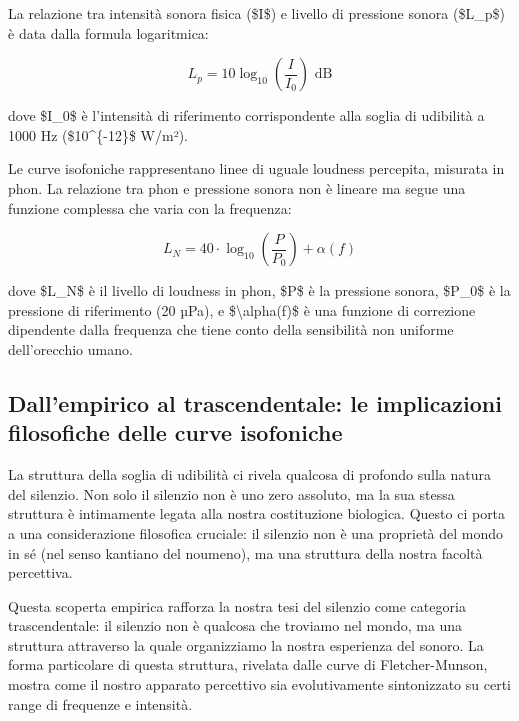 \documentclass[a4paper,11pt]{article}
\begin{document}
La relazione tra intensità sonora fisica (\$I\$) e livello di pressione
sonora (\$L\_p\$) è data dalla formula logaritmica:

\begin{displaymath}
L_p = 10 \log_{10}\left(\frac{I}{I_0}\right) \text{ dB}
\end{displaymath}

dove \$I\_0\$ è l'intensità di riferimento corrispondente alla soglia di
udibilità a 1000 Hz (\$10\^{}\{-12\}\$ W/m²).

Le curve isofoniche rappresentano linee di uguale loudness percepita,
misurata in phon. La relazione tra phon e pressione sonora non è lineare
ma segue una funzione complessa che varia con la frequenza:

\begin{displaymath}
L_N = 40 \cdot \log_{10}\left(\frac{P}{P_0}\right) + \alpha(f)
\end{displaymath}

dove \$L\_N\$ è il livello di loudness in phon, \$P\$ è la pressione sonora,
\$P\_0\$ è la pressione di riferimento (20 µPa), e \$\textbackslash{}alpha(f)\$ è una
funzione di correzione dipendente dalla frequenza che tiene conto della
sensibilità non uniforme dell'orecchio umano.

\subsection{Dall'empirico al trascendentale: le implicazioni filosofiche delle curve isofoniche}\hypertarget{dallempirico-al-trascendentale-le-implicazioni-filosofiche-delle-curve-isofoniche}{}\label{dallempirico-al-trascendentale-le-implicazioni-filosofiche-delle-curve-isofoniche}

La struttura della soglia di udibilità ci rivela qualcosa di profondo
sulla natura del silenzio. Non solo il silenzio non è uno zero assoluto,
ma la sua stessa struttura è intimamente legata alla nostra costituzione
biologica. Questo ci porta a una considerazione filosofica cruciale: il
silenzio non è una proprietà del mondo in sé (nel senso kantiano del
noumeno), ma una struttura della nostra facoltà percettiva.

Questa scoperta empirica rafforza la nostra tesi del silenzio come
categoria trascendentale: il silenzio non è qualcosa che troviamo nel
mondo, ma una struttura attraverso la quale organizziamo la nostra
esperienza del sonoro. La forma particolare di questa struttura,
rivelata dalle curve di Fletcher-Munson, mostra come il nostro apparato
percettivo sia evolutivamente sintonizzato su certi range di frequenze e
intensità.
\end{document}
